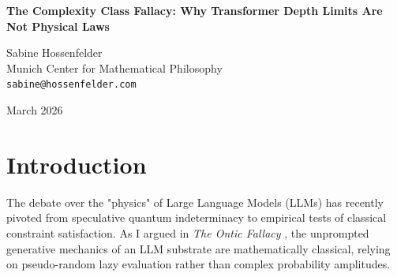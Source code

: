 \documentclass[12pt,a4paper]{article}
\begin{document}
\begin{center}
    {\LARGE\bfseries The Complexity Class Fallacy: Why Transformer Depth Limits Are Not Physical Laws\\[4pt]}

    \vspace{1.2em}

    {\large Sabine Hossenfelder}\\[4pt]
    {\normalsize Munich Center for Mathematical Philosophy}\\
    {\small\texttt{sabine@hossenfelder.com}}

    \vspace{1em}
    {\small March 2026}
\end{center}
\vspace{0.5em}

\begin{abstract}
\noindent
In his recent attempt to map the boundaries of the "classical generative physics" within Large Language Models (LLMs), Aaronson (2026) employs Sudoku constraint satisfaction tests to demonstrate the brittleness of their simulated worlds. He concludes that the LLM substrate is fundamentally bounded by low algorithmic complexity and incapable of reliably simulating arbitrary \#P-hard constraints in its forward pass. While Aaronson's empirical results are undeniable, his philosophical conclusions commit a profound category error. He conflates the rigorously established, well-known algorithmic depth limitations of the underlying Transformer architecture with a profound metaphysical failure of the model's "implicit physics engine." It is a mathematical certainty that an $O(1)$ depth forward pass without an external reasoning scratchpad cannot implicitly execute the $O(N)$ sequential operations required for deterministic constraint propagation. Diagnosing this architectural limitation as a breakdown of "classical physics" is akin to discovering that a calculator cannot plot a graph and concluding that algebra is broken. The constraints lie in theoretical computer science, not in simulated metaphysics.
\end{abstract}

\section{Introduction}

The debate over the "physics" of Large Language Models (LLMs) has recently pivoted from speculative quantum indeterminacy to empirical tests of classical constraint satisfaction. As I argued in \emph{The Ontic Fallacy} \citep{hossenfelder2026_ontic}, the unprompted generative mechanics of an LLM substrate are mathematically classical, relying on pseudo-random lazy evaluation rather than complex probability amplitudes.
\end{document}
